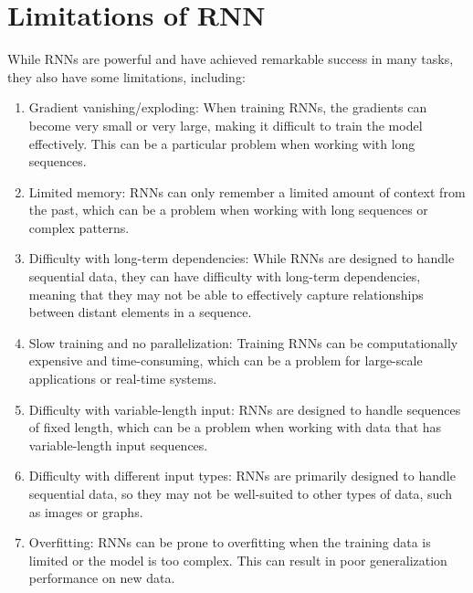 \documentclass{report}
\begin{document}
\section{Limitations of RNN}
While RNNs are powerful and have achieved remarkable success in many tasks, they also have some limitations, including:
\begin{enumerate}
	\item Gradient vanishing/exploding: When training RNNs, the gradients can become very small or very large, making it difficult to train the model effectively. This can be a particular problem when working with long sequences.

	\item Limited memory: RNNs can only remember a limited amount of context from the past, which can be a problem when working with long sequences or complex patterns.

	\item Difficulty with long-term dependencies: While RNNs are designed to handle sequential data, they can have difficulty with long-term dependencies, meaning that they may not be able to effectively capture relationships between distant elements in a sequence.

	\item Slow training and no parallelization: Training RNNs can be computationally expensive and time-consuming, which can be a problem for large-scale applications or real-time systems.

	\item Difficulty with variable-length input: RNNs are designed to handle sequences of fixed length, which can be a problem when working with data that has variable-length input sequences.

	\item Difficulty with different input types: RNNs are primarily designed to handle sequential data, so they may not be well-suited to other types of data, such as images or graphs.

	\item Overfitting: RNNs can be prone to overfitting when the training data is limited or the model is too complex. This can result in poor generalization performance on new data.
\end{enumerate}
\end{document}
